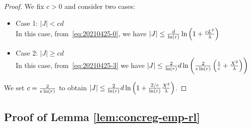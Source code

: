 \begin{proof}
  We fix $c>0$ and consider two cases:
  \begin{itemize}
    \item Case 1: $|J| < cd$ \\
    In this case, from~\eqref{eq:20210425-0}, we have $|J| \le \fr{d}{\ln(r)} \ln\del{1 + \fr{cL^2}{\lam} }  $ 
    \item Case 2: $|J| \ge cd$\\
    In this case, from~\eqref{eq:20210425-3} we have $ |J| \le  \fr{2}{\ln(r)} d \ln\del{\fr{2}{e \ln(r)}\del{\fr 1 {c}  + \frac{X^2}{ \lam}}  }$
  \end{itemize}
  We set $c = { \frac{2}{e \ln(r)} }$ to obtain
  $   |J| \le \frac{2}{\ln(r)} d \ln \del{1 + \fr{2/e}{\ln(r)}\frac {X^2} {\lam}}  $.
\end{proof}


\subsection{Proof of Lemma \ref{lem:concreg-emp-rl}}


